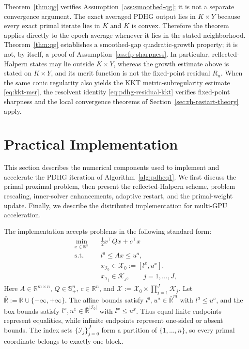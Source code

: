 \documentclass[letterpaper]{article} %
\theoremstyle{definition}
\theoremstyle{remark}
\newcommand{\AVERAGEDPDHG}{}
\begin{document}
\ifdefined\AVERAGEDPDHG
Theorem~\ref{thm:qg} verifies Assumption~\ref{ass:smoothed-qg}; it is not a
separate convergence argument.  The exact averaged PDHG output lies in
$K\times Y$ because every exact primal iterate lies in $K$ and $K$ is convex.
Therefore the theorem applies directly to the epoch average whenever it lies
in the stated neighborhood.
\else
Theorem~\ref{thm:qg} establishes a smoothed-gap quadratic-growth property; it
is not, by itself, a proof of Assumption~\ref{ass:fp-sharpness}.  In
particular, reflected-Halpern states may lie outside $K\times Y$, whereas the
growth estimate above is stated on $K\times Y$, and its merit function is not
the fixed-point residual $R_n$.  When the same conic regularity also yields
the KKT metric-subregularity estimate \eqref{eq:kkt-msr}, the resolvent
identity \eqref{eq:pdhg-residual-kkt} verifies fixed-point sharpness and the
local convergence theorems of Section~\ref{sec:rh-restart-theory} apply.
\fi

%
\section{Practical Implementation}
\label{sec:implementation}

This section describes the numerical components used to implement and
accelerate the PDHG iteration of Algorithm~\ref{alg:pdhcq1}.  We first discuss the
primal proximal problem, then present the reflected-Halpern scheme, problem
rescaling, inner-solver enhancements, adaptive restart, and the primal-weight
update.  Finally, we describe the distributed implementation for multi-GPU
acceleration.

The implementation accepts problems in the following standard form:
\begin{equation}
\label{eq:solver-input}
\begin{aligned}
    \min_{x\in\mathbb R^n}\quad
    &\frac12x^\top Qx+c^\top x\\
    \mathrm{s.t.}\quad
    &l^a\le Ax\le u^a,\\
    &x_{\mathcal I_0}\in
      \mathcal X_0:=[l^x,u^x],\\
    &x_{\mathcal I_j}\in\mathcal K_j,
      \qquad j=1,\ldots,J,
\end{aligned}
\end{equation}
Here $A\in\mathbb R^{m\times n}$, $Q\in\mathbb S_+^n$,
$c\in\mathbb R^n$, and
$\mathcal X:=\mathcal X_0\times\prod_{j=1}^J\mathcal K_j$.  Let
$\overline{\mathbb R}:=\mathbb R\cup\{-\infty,+\infty\}$.  The affine
bounds satisfy $l^a,u^a\in\overline{\mathbb R}^m$ with $l^a\le u^a$, and
the box bounds satisfy
$l^x,u^x\in\overline{\mathbb R}^{|\mathcal I_0|}$ with $l^x\le u^x$.
Thus equal finite endpoints represent equalities, while infinite endpoints
represent one-sided or absent bounds.  The index sets
$\{\mathcal I_j\}_{j=0}^J$ form a partition of $\{1,\ldots,n\}$, so every
primal coordinate belongs to exactly one block.
\end{document}
